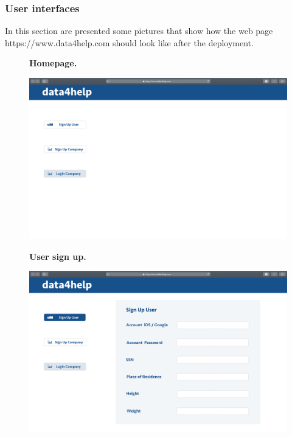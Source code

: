 \documentclass{article}
\begin{document}
\subsubsection{User interfaces}
In this section are presented some pictures that show how the web page https://www.data4help.com should look like after the deployment.
\begin{figure}[h!]
\centering
    \textbf{Homepage.}\par\medskip
	\includegraphics[width= \linewidth]{1homepage.png}
\end{figure}
\begin{figure}[h!]
\centering
    \textbf{User sign up.}\par\medskip
	\includegraphics[width= \linewidth]{2signupuser.png}
\end{figure}\newpage
\end{document}
